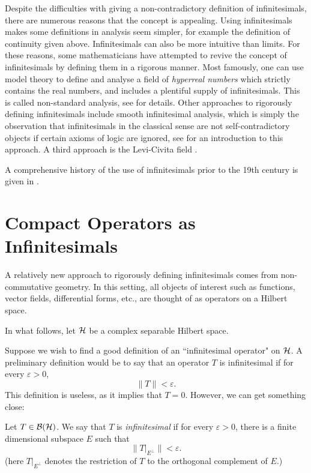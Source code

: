 Despite the difficulties with giving a non-contradictory definition
of infinitesimals, there are numerous reasons that the concept is appealing. 
Using infinitesimals makes some definitions in analysis seem simpler, for example
the definition of continuity given above. Infinitesimals
can also be more intuitive than limits. For these reasons, some mathematicians
have attempted to revive the concept of infinitesimals
by defining them in a rigorous manner. Most famously, one can 
use model theory to define and analyse a field of \emph{hyperreal numbers}
which strictly contains the real numbers, and includes a plentiful supply of infinitesimals.
This is called non-standard analysis, see \cite{robinson} for details.
Other approaches to rigorously defining infinitesimals include smooth infinitesimal
analysis, which is simply the observation that infinitesimals in the classical
sense are not self-contradictory objects if certain axioms of logic are ignored, see
\cite{sia} for an introduction to this approach.
A third approach is the Levi-Civita field \cite{lcf}.

A comprehensive history of the use of infinitesimals prior to the 19th
century is given in \cite{infinitesimalBook}.

\section{Compact Operators as Infinitesimals}
A relatively new approach to rigorously defining infinitesimals
comes from non-commutative geometry. In this setting, all objects
of interest such as functions, vector fields, differential forms, etc., are
thought of as operators on a Hilbert space. 

In what follows, let $\mathcal{H}$ be a complex separable Hilbert space. 

Suppose we wish to find a good definition
of an ``infinitesimal operator" on $\mathcal{H}$. A preliminary definition
would be to say that an operator $T$ is infinitesimal if for every $\varepsilon > 0$, 
\begin{equation}
    \|T\| < \varepsilon.
\end{equation}  
This definition is useless, as it implies that $T = 0$. However, we can get something close:
\begin{definition}
\label{infinitesimal}
    Let $T \in \mathcal{B}(\mathcal{H})$. We say that $T$ is \emph{infinitesimal}
    if for every $\varepsilon > 0$, there is a finite dimensional
    subspace $E$ such that
    \begin{equation}
        \|T|_{E^\perp}\| < \varepsilon.
    \end{equation}
    (here $T|_{E^\perp}$ denotes the restriction of $T$ to the orthogonal complement of $E$.)
\end{definition}

